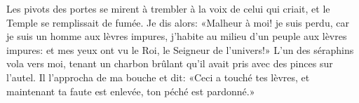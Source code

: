 Les pivots des portes se mirent à trembler à la voix de celui qui criait,
	et le Temple se remplissait de fumée.
Je dis alors: «Malheur à moi! je suis perdu, car je suis un homme aux lèvres impures,
	j’habite au milieu d’un peuple aux lèvres impures:
	et mes yeux ont vu le Roi, le Seigneur de l’univers!»
L’un des séraphins vola vers moi,
	tenant un charbon brûlant qu’il avait pris avec des pinces sur l’autel.
Il l’approcha de ma bouche et dit: «Ceci a touché tes lèvres,
	et maintenant ta faute est enlevée, ton péché est pardonné.»
